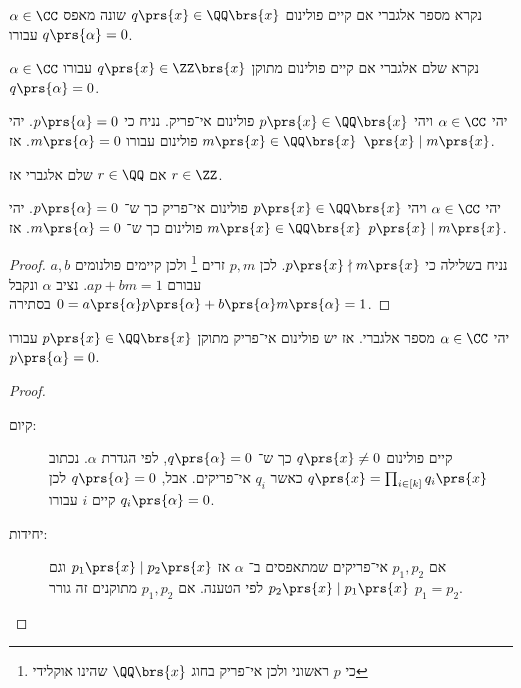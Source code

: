 \documentclass[a4paper,10pt,twoside,openany]{book}
\begin{document}
\begin{definition}
$\alpha \in \CC$
נקרא מספר אלגברי אם קיים פולינום
$q\prs{x} \in \QQ\brs{x}$
שונה מאפס עבורו
$q\prs{\alpha} = 0$.
\end{definition}
\begin{definition}
$\alpha \in \CC$
נקרא שלם אלגברי אם קיים פולינום מתוקן
$q\prs{x} \in \ZZ\brs{x}$
עבורו
$q \prs{\alpha} = 0$.
\end{definition}
\begin{proposition}
יהי
$\alpha \in \CC$
ויהי
$p\prs{x} \in \QQ\brs{x}$
פולינום אי־פריק.
נניח כי
$p\prs{\alpha} = 0$.
יהי
$m \prs{x} \in \QQ\brs{x}$
פולינום עבורו
$m\prs{\alpha} = 0$.
אז
$\prs{x} \mid m\prs{x}$.
\end{proposition}
\begin{proposition}
אם
$r \in \QQ$
שלם אלגברי אז
$r \in \ZZ$.
\end{proposition}

\begin{proposition}
יהי
$\alpha \in \CC$
ויהי
$p\prs{x} \in \QQ\brs{x}$
פולינום אי־פריק כך ש־%
$p\prs{\alpha} = 0$.
יהי
$m\prs{x} \in \QQ\brs{x}$
פולינום כך ש־%
$m\prs{\alpha} = 0$.
אז
$p\prs{x} \mid m\prs{x}$.
\end{proposition}

\begin{proof}
נניח בשלילה כי
$p\prs{x} \nmid m\prs{x}$.
לכן
$p,m$
זרים
\footnote{
כי
$p$
ראשוני ולכן אי־פריק בחוג
$\QQ\brs{x}$
שהינו אוקלידי}
ולכן קיימים פולנומים
$a,b$
עבורם
$ap + bm = 1$.
נציב
$\alpha$
ונקבל
$0 = a\prs{\alpha} p\prs{\alpha} + b\prs{\alpha} m\prs{\alpha} = 1$
בסתירה.
\end{proof}

\begin{proposition}
יהי
$\alpha \in \CC$
מספר אלגברי.
אז יש פולינום אי־פריק מתוקן
$p\prs{x} \in \QQ\brs{x}$
עבורו
$p\prs{\alpha} = 0$.
\end{proposition}
\begin{proof}
\begin{description}
\item[קיום:]
קיים פולינום
$q\prs{x} \neq 0$
כך ש־%
$q\prs{\alpha} = 0$,
לפי הגדרת
$\alpha$.
נכתוב
$q\prs{x} = \prod_{i \in [k]} q_i\prs{x}$
כאשר
$q_i$
אי־פריקים.
אבל,
$q\prs{\alpha} = 0$
לכן קיים
$i$
עבורו
$q_i\prs{\alpha} = 0$.

\item[יחידות:]
אם
$p_1,p_2$
אי־פריקים שמתאפסים ב־%
$\alpha$
אז
$p_1\prs{x} \mid p_2\prs{x}$
וגם
$p_2 \prs{x} \mid p_1\prs{x}$
לפי הטענה. אם
$p_1,p_2$
מתוקנים זה גורר
$p_1 = p_2$.
\end{description}
\end{proof}
\end{document}
